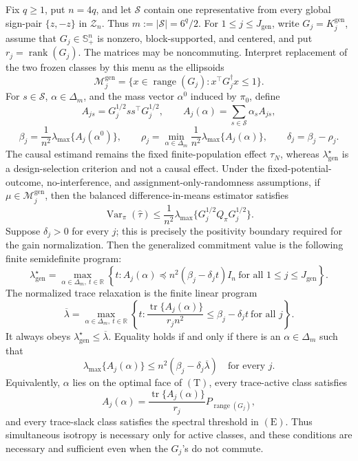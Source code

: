 Fix \(q\ge1\), put \(n=4q\), and let \(\mathscr S\) contain one representative from every global sign-pair \(\{z,-z\}\) in \(\mathcal Z_n\). Thus \(m:=|\mathscr S|=6^q/2\). For \(1\le j\le J_{\mathrm{gen}}\), write \(G_j=K_j^{\mathrm{gen}}\), assume that \(G_j\in\mathbb S_+^n\) is nonzero, block-supported, and centered, and put \(r_j=\operatorname{rank}(G_j)\). The matrices may be noncommuting. Interpret replacement of the two frozen classes by this menu as the ellipsoids
\[
\mathcal M_j^{\mathrm{gen}}
=\{x\in\operatorname{range}(G_j):x^\top G_j^\dagger x\le1\}.
\]
For \(s\in\mathscr S\), \(\alpha\in\Delta_m\), and the mass vector \(\alpha^0\) induced by \(\pi_0\), define
\[
A_{js}=G_j^{1/2}ss^\top G_j^{1/2},
\qquad
A_j(\alpha)=\sum_{s\in\mathscr S}\alpha_sA_{js},
\]
\[
\beta_j=\frac1{n^2}\lambda_{\max}\{A_j(\alpha^0)\},
\qquad
\rho_j=\min_{\alpha\in\Delta_m}\frac1{n^2}\lambda_{\max}\{A_j(\alpha)\},
\qquad
\delta_j=\beta_j-\rho_j.
\]
The causal estimand remains the fixed finite-population effect \(\tau_N\), whereas \(\lambda_{\mathrm{gen}}^\star\) is a design-selection criterion and not a causal effect. Under the fixed-potential-outcome, no-interference, and assignment-only-randomness assumptions, if \(\mu\in\mathcal M_j^{\mathrm{gen}}\), then the balanced difference-in-means estimator satisfies
\[
\operatorname{Var}_\pi(\widehat\tau)
\le \frac1{n^2}\lambda_{\max}
\{G_j^{1/2}Q_\pi G_j^{1/2}\}.
\]
Suppose \(\delta_j>0\) for every \(j\); this is precisely the positivity boundary required for the gain normalization. Then the generalized commitment value is the following finite semidefinite program:
\[
\boxed{
\lambda_{\mathrm{gen}}^\star
=\max_{\alpha\in\Delta_m,\ t\in\mathbb R}
\left\{t:
A_j(\alpha)\preceq n^2(\beta_j-\delta_jt)I_n
\ \text{for all }1\le j\le J_{\mathrm{gen}}
\right\}.}
\tag{P}
\]
The normalized trace relaxation is the finite linear program
\[
\overline\lambda
=\max_{\alpha\in\Delta_m,\ t\in\mathbb R}
\left\{t:
\frac{\operatorname{tr}\{A_j(\alpha)\}}{r_jn^2}
\le\beta_j-\delta_jt
\ \text{for all }j
\right\}.
\tag{T}
\]
It always obeys \(\lambda_{\mathrm{gen}}^\star\le\overline\lambda\). Equality holds if and only if there is an \(\alpha\in\Delta_m\) such that
\[
\lambda_{\max}\{A_j(\alpha)\}
\le n^2(\beta_j-\delta_j\overline\lambda)
\quad\text{for every }j.
\tag{E}
\]
Equivalently, \(\alpha\) lies on the optimal face of \((\mathrm T)\), every trace-active class satisfies
\[
A_j(\alpha)
=\frac{\operatorname{tr}\{A_j(\alpha)\}}{r_j}
P_{\operatorname{range}(G_j)},
\tag{I}
\]
and every trace-slack class satisfies the spectral threshold in \((\mathrm E)\). Thus simultaneous isotropy is necessary only for active classes, and these conditions are necessary and sufficient even when the \(G_j\)'s do not commute.

